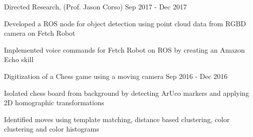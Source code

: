

\begin{cventries2}

  \cventrymini
    {Directed Research, (Prof. Jason Corso)} %
    {Sep 2017 - Dec 2017} %
    {
      \begin{cvitems} 
        \item {Developed a ROS node for object detection using point cloud data from RGBD camera on Fetch Robot}
        \item{Implemented voice commands for Fetch Robot on ROS by creating an Amazon Echo skill}
      \end{cvitems}
    } %
	\cventrymini
	{Digitization of a Chess game using a moving camera} %
	{Sep 2016 - Dec 2016} %
	{
		\begin{cvitems} 
			\item {Isolated chess board from background by detecting ArUco markers and applying 2D homographic transformations}
			\item{Identified moves using template matching, distance based clustering, color clustering and color histograms}
		\end{cvitems}
	} %
\end{cventries2}    







